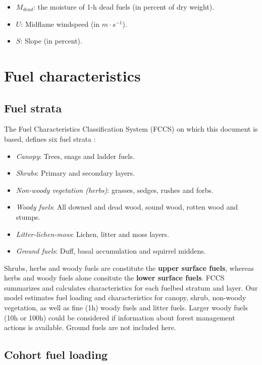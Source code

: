 \documentclass[]{book}
\providecommand{\tightlist}{%
  \setlength{\itemsep}{0pt}\setlength{\parskip}{0pt}}
\begin{document}
\begin{itemize}
\tightlist
\item
  \(M_{dead}\): the moisture of 1-h dead fuels (in percent of dry
  weight).
\item
  \(U\): Midflame windspeed (in \(m\cdot s^{-1}\)).
\item
  \(S\): Slope (in percent).
\end{itemize}

\section{Fuel characteristics}\label{fuel-characteristics}

\subsection{Fuel strata}\label{fuel-strata}

The Fuel Characteristics Classification System (FCCS) on which this
document is based, defines six fuel strata \citep{Prichard2013}:

\begin{itemize}
\tightlist
\item
  \emph{Canopy}: Trees, snags and ladder fuels.
\item
  \emph{Shrubs}: Primary and secondary layers.
\item
  \emph{Non-woody vegetation (herbs)}: grasses, sedges, rushes and
  forbs.
\item
  \emph{Woody fuels}: All downed and dead wood, sound wood, rotten wood
  and stumps.
\item
  \emph{Litter-lichen-moss}: Lichen, litter and moss layers.
\item
  \emph{Ground fuels}: Duff, basal accumulation and squirrel middens.
\end{itemize}

Shrubs, herbs and woody fuels are constitute the \textbf{upper surface
fuels}, whereas herbs and woody fuels alone consitute the \textbf{lower
surface fuels}. FCCS summarizes and calculates characteristics for each
fuelbed stratum and layer. Our model estimates fuel loading and
characteristics for canopy, shrub, non-woody vegetation, as well as fine
(1h) woody fuels and litter fuels. Larger woody fuels (10h or 100h)
could be considered if information about forest management actions is
available. Ground fuels are not included here.

\subsection{Cohort fuel loading}\label{cohort-fuel-loading}
\end{document}
